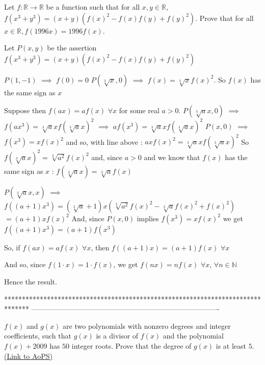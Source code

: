 \begin{solution}
	\begin{tcolorbox}Let $ f: \mathbb{R} \rightarrow \mathbb{R}$ be a function such that for all $ x,y \in \mathbb{R}$, $ f(x^3 + y^3) = (x + y)(f(x)^2 - f(x)f(y) + f(y)^2).$ Prove that for all $ x \in \mathbb{R}, f(1996x) = 1996f(x)$.\end{tcolorbox}

Let $ P(x,y)$ be the assertion $ f(x^3 + y^3) = (x + y)(f(x)^2 - f(x)f(y) + f(y)^2)$

$ P(1, - 1)$ $ \implies$ $ f(0) = 0$
$ P(\sqrt [3]x,0)$ $ \implies$ $ f(x) = \sqrt [3]xf(x)^2$. So $ f(x)$ has the same sign as $ x$

Suppose then $ f(ax) = af(x)$ $ \forall x$ for some real $ a > 0$.
$ P(\sqrt [3]ax,0)$ $ \implies$ $ f(ax^3) = \sqrt [3]axf(\sqrt [3]ax)^2$ $ \implies$ $ af(x^3) = \sqrt [3]axf(\sqrt [3]ax)^2$
$ P(x,0)$ $ \implies$ $ f(x^3) = xf(x)^2$ and so, with line above : $ axf(x)^2 = \sqrt [3]axf(\sqrt [3]ax)^2$ 
So $ f(\sqrt [3]ax)^2 = \sqrt [3]{a^2}f(x)^2$ and, since $ a > 0$ and we know that $ f(x)$ has the same sign as $ x$ : $ f(\sqrt [3]ax) = \sqrt [3]{a}f(x)$

$ P(\sqrt [3]ax,x)$ $ \implies$ $ f((a + 1)x^3) = (\sqrt [3]a + 1)x(\sqrt [3]{a^2}f(x)^2 - \sqrt [3]af(x)^2 + f(x)^2)$ $ = (a + 1)xf(x)^2$
And, since $ P(x,0)$ implies $ f(x^3) = xf(x)^2$ we get $ f((a + 1)x^3) = (a + 1)f(x^3)$

So, if $ f(ax) = af(x)$ $ \forall x$, then $ f((a + 1)x) = (a + 1)f(x)$ $ \forall x$

And so, since $ f(1\cdot x) = 1\cdot f(x)$, we get $ f(nx) = nf(x)$ $ \forall x$, $ \forall n\in\mathbb N$

Hence the result.
\end{solution}
*******************************************************************************
-------------------------------------------------------------------------------

\begin{problem}
	$ f(x)$ and $ g(x)$ are two polynomials with nonzero degrees and integer coefficients, such that $ g(x)$ is a divisor of $ f(x)$ and the polynomial $ f(x)+2009$ has $ 50$ integer roots. Prove that the degree of $ g(x)$ is at least $ 5$.
	\flushright \href{https://artofproblemsolving.com/community/c6h279980}{(Link to AoPS)}
\end{problem}



